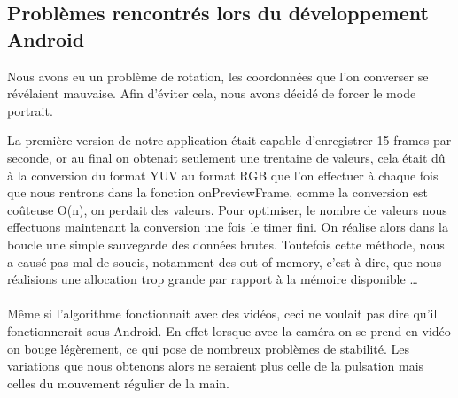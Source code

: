 \subsection{Problèmes rencontrés lors du développement Android}

Nous avons eu un problème de rotation, les coordonnées que l'on converser se révélaient mauvaise. Afin d'éviter cela, nous avons décidé de forcer le mode portrait.

La première version de notre application était capable d'enregistrer 15 frames par seconde, or au final on obtenait seulement une trentaine de valeurs, cela était dû à la conversion du
 format YUV au format RGB que l'on effectuer à chaque fois que nous rentrons dans la fonction onPreviewFrame, comme la conversion est coûteuse O(n), on perdait des valeurs. Pour
  optimiser, le nombre de valeurs nous effectuons maintenant la conversion une fois le timer fini. On réalise alors dans la boucle une simple sauvegarde des données brutes.
Toutefois cette méthode, nous a causé pas mal de soucis, notamment des out of memory, c'est-à-dire, que nous réalisions une allocation trop grande par rapport à la mémoire disponible
\ldots{}\\
\\
Même si l'algorithme fonctionnait avec des vidéos, ceci ne voulait pas dire qu'il fonctionnerait sous Android. En effet lorsque avec la caméra on se prend en vidéo on bouge légèrement,
ce qui pose de nombreux problèmes de stabilité. Les variations que nous obtenons alors ne seraient plus celle de la pulsation mais celles du mouvement régulier de la main.
